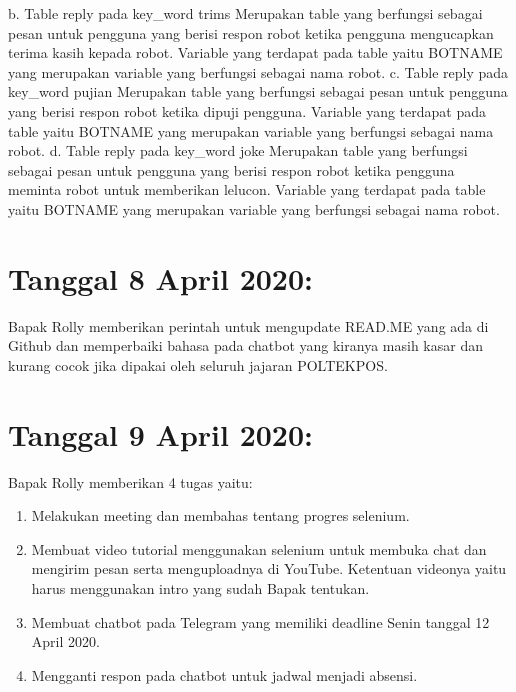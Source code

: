 \documentclass{article}
\newcounter{saveenumi}
\newcommand{\seti}{\setcounter{saveenumi}{\value{enumi}}} %
\begin{document}
\begin{enumerate}
		\newline
		b.	Table reply pada key\_word trims
		Merupakan table yang berfungsi sebagai pesan untuk pengguna yang berisi respon robot ketika pengguna mengucapkan terima kasih kepada robot. Variable yang terdapat pada table yaitu BOTNAME yang merupakan variable yang berfungsi sebagai nama robot.
		\newline
		c.	Table reply pada key\_word pujian
		Merupakan table yang berfungsi sebagai pesan untuk pengguna yang berisi respon robot ketika dipuji pengguna. Variable yang terdapat pada table yaitu BOTNAME yang merupakan variable yang berfungsi sebagai nama robot.
		\newline
		d.	Table reply pada key\_word joke
		Merupakan table yang berfungsi sebagai pesan untuk pengguna yang berisi respon robot ketika pengguna meminta robot untuk memberikan lelucon. Variable yang terdapat pada table yaitu BOTNAME yang merupakan variable yang berfungsi sebagai nama robot.
		\newline
		\newline
		\seti %
	\end{enumerate}


\section{Tanggal 8 April 2020:}
Bapak Rolly memberikan perintah untuk mengupdate READ.ME yang ada di Github dan memperbaiki bahasa pada chatbot yang kiranya masih kasar dan kurang cocok jika dipakai oleh seluruh jajaran POLTEKPOS.
\newline
\newline

\section{Tanggal 9 April 2020:}
Bapak Rolly memberikan 4 tugas yaitu:
	\newline
	\begin{enumerate}
			\item Melakukan meeting dan membahas tentang progres selenium.
			\newline
			\item Membuat video tutorial menggunakan selenium untuk membuka chat dan mengirim pesan serta menguploadnya di YouTube. Ketentuan videonya yaitu harus menggunakan intro yang sudah Bapak tentukan.
			\newline
			\item Membuat chatbot pada Telegram yang memiliki deadline Senin tanggal 12 April 2020.
			\newline
			\item Mengganti respon pada chatbot untuk jadwal menjadi absensi.
			\newline
		\seti %
	\end{enumerate}
\end{document}
